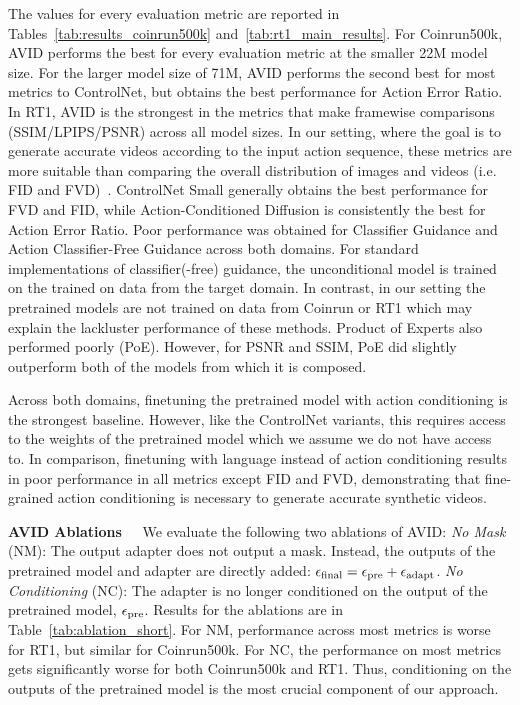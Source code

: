 The values for every evaluation metric are reported in Tables~\ref{tab:results_coinrun500k} and~\ref{tab:rt1_main_results}. For Coinrun500k, AVID performs the best for every evaluation metric at the smaller 22M model size.
%
For the larger model size of 71M, AVID performs the second best for most metrics to ControlNet, but obtains the best performance for Action Error Ratio.
%
In RT1, AVID is the strongest in the metrics that make framewise comparisons (SSIM/LPIPS/PSNR) across all model sizes. 
%
In our setting, where the goal is to generate accurate videos according to the input action sequence, these metrics are more suitable than comparing the overall distribution of images and videos (i.e. FID and FVD)~\citep{zhu2024irasim}. ControlNet Small generally obtains the best performance for FVD and FID, while Action-Conditioned Diffusion is consistently the best for Action Error Ratio.
%
Poor performance was obtained for Classifier Guidance and Action Classifier-Free Guidance across both domains. 
%
For standard implementations of  classifier(-free) guidance, the unconditional model is trained on the trained on data from the target domain. In contrast, in our setting the pretrained models are not trained on data from Coinrun or RT1 which may explain the lackluster performance of these methods.
%
Product of Experts also performed poorly (PoE). However, for PSNR and SSIM, PoE did slightly outperform both of the models from which it is composed.

Across both domains, finetuning the pretrained model with action conditioning is the strongest baseline. However, like the ControlNet variants, this requires access to the weights of the pretrained model which we assume we do not have access to. In comparison, finetuning with language instead of action conditioning results in poor performance in all metrics except FID and FVD, demonstrating that fine-grained action conditioning is necessary to generate accurate synthetic videos.

\textbf{AVID Ablations\ \ } We evaluate the following two ablations of AVID: \textit{No Mask} (NM): The output adapter does not output a mask. Instead, the outputs of the pretrained model and adapter are directly added: $ \epsilon_{\textnormal{final}} = \epsilon_{\textnormal{pre}}  + \epsilon_{\textnormal{adapt}}  $. \textit{No Conditioning} (NC): The adapter is no longer conditioned on  the output of the pretrained model, $\epsilon_{\textnormal{pre}}$. Results for the ablations are in Table~\ref{tab:ablation_short}. For NM, performance across most metrics is worse for RT1, but similar for Coinrun500k. For NC, the performance on most metrics gets significantly worse for both Coinrun500k and RT1. Thus, conditioning on the outputs of the pretrained model is the most crucial component of our approach. 

